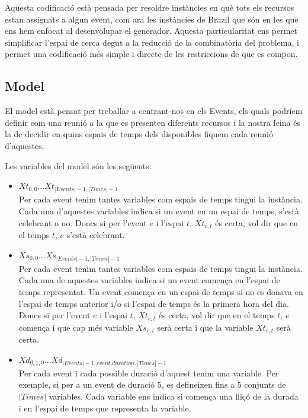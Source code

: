 \documentclass[11pt,a4paper,twoside]{report}
\begin{document}
  Aquesta codificació està pensada per resoldre instàncies en què tots els recursos estan assignats a algun event, com ara les instàncies de Brazil que són en les que ens hem enfocat al desenvolupar el generador. 
  Aquesta particularitat ens permet simplificar l'espai de cerca degut a la reducció de la combinatòria del problema, i permet una codificació més simple i directe de les restriccions de que es compon.

  \subsection{Model}

  El model està pensat per treballar a centrant-nos en els Events, els quals podríem definir com una reunió a la que es presenten diferents recursos i la nostra feina és la de decidir en quins espais de temps dels disponibles fiquem cada reunió d'aquestes.

  Les variables del model són les següents:
  \begin{itemize}
    \item $Xt_{0,0} . . . Xt_{|Events|-1,|Times|-1}$\\Per cada event tenim tantes variables com espais de temps tingui la instància. Cada una d'aquestes variables indica si un event en un espai de temps, s'està celebrant o no. 
    Doncs si per l'event $e$ i l'espai $t$, $Xt_{e,t}$ és certa, vol dir que en el temps $t$, $e$ s'està celebrant.
    \item $Xs_{0,0} . . . Xs_{|Events|-1,|Times|-1}$\\Per cada event tenim tantes variables com espais de temps tingui la instància. Cada una de aquestes variables indica si un event comença en l'espai de temps representat. Un event comença en un espai de temps si no es donava en l'espai de temps anterior i/o si l'espai de temps és la primera hora del dia.
    Doncs si per l'event $e$ i l'espai $t$, $Xt_{e,t}$ és certa, vol dir que en el temps $t$, $e$ comença i que cap més variable $Xs_{e,i}$ serà certa i que la variable $Xt_{e,t}$ serà certa.
    \item $Xd_{0,1,0} . . . Xd_{|Events|-1, event.duration, |Times|-1}$\\ Per cada event i cada possible duració d'aquest tenim una variable. Per exemple, si per a un event de duració 5, es defineixen fins a 5 conjunts de $|Times|$ variables. 
    Cada variable ens indica si comença una lliçó de la durada i en l'espai de temps que representa la variable. 
  \end{itemize}
\end{document}
